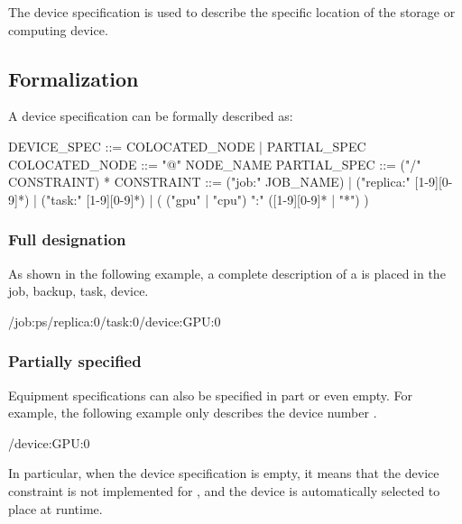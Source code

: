 \begin{content}
The device specification  is used to describe the specific location of the  storage or computing device.


\subsection{Formalization}
A device specification can be formally described as:

\begin{leftbar}
\begin{python}
DEVICE_SPEC ::= COLOCATED_NODE | PARTIAL_SPEC
COLOCATED_NODE ::= "@" NODE_NAME
PARTIAL_SPEC ::= ("/" CONSTRAINT) *
CONSTRAINT ::= ("job:" JOB_NAME)
             | ("replica:" [1-9][0-9]*)
             | ("task:" [1-9][0-9]*)
             | ( ("gpu" | "cpu") ":" ([1-9][0-9]* | "*") )
\end{python}
\end{leftbar}


\subsubsection{Full designation}
As shown in the following example, a complete description of a  is placed in the  job,  backup,  task,  device.

\begin{leftbar}
\begin{python}
/job:ps/replica:0/task:0/device:GPU:0
\end{python}
\end{leftbar}


\subsubsection{Partially specified}
Equipment specifications can also be specified in part or even empty. For example, the following example only describes the device number .

\begin{leftbar}
\begin{python}
/device:GPU:0
\end{python}
\end{leftbar}

In particular, when the device specification is empty, it means that the device constraint is not implemented for , and the device is automatically selected to place  at runtime.


\end{content}
